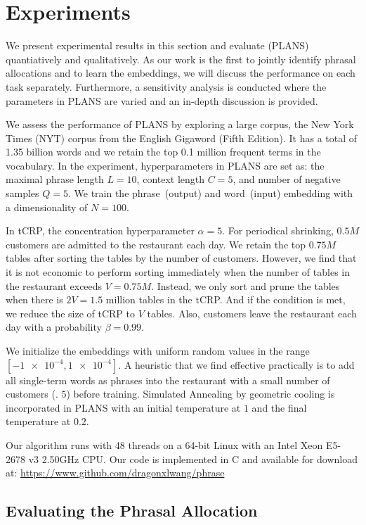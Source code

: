 \section{Experiments}

We present  experimental results in this section and evaluate
\PLANS{} (PLANS)  quantiatively and qualitatively. As our work is the
first to jointly identify phrasal allocations and to learn the embeddings, we
will discuss the performance on each task separately. Furthermore, a
sensitivity analysis is conducted where the parameters in PLANS are varied and
an in-depth discussion is provided.

We assess the performance of PLANS by exploring a large corpus, the New York
Times (NYT) corpus from the English Gigaword (Fifth Edition). It has a total of
1.35 billion words and we retain the top 0.1 million frequent terms in the
vocabulary. In the experiment, hyperparameters in PLANS are set as: the maximal
phrase length $L = 10$, context length $C = 5$, and number of negative samples
$Q = 5$. We train the phrase~(output) and word~(input) embedding with a
dimensionality of $N = 100$.

In tCRP, the concentration hyperparameter $\alpha = 5$. For periodical shrinking,
$0.5M$ customers are admitted to the restaurant each day. We retain the top
$0.75M$ tables after sorting the tables by the number of customers. However, we
find that it is not economic to perform sorting immediately when the number of
tables in the restaurant exceeds $V = 0.75M$.  Instead, we only sort and prune
the tables when there is $2V = 1.5$ million tables in the tCRP. And if the
condition is met, we reduce the size of tCRP to $V$ tables. Also, customers
leave the restaurant each day with a probability $\beta = 0.99$.

We initialize the embeddings with uniform random values in the range
$[\SI{-1e-4}, \SI{1e-4}]$. A heuristic that we find effective practically is to
add all single-term words as phrases into the restaurant with a small number of
customers (\eg. $5$) before training. Simulated Annealing by geometric cooling
is incorporated in PLANS with an initial temperature at $1$ and the final
temperature at $0.2$.

Our algorithm runs with 48 threads on a 64-bit Linux with an Intel Xeon E5-2678
v3 2.50GHz CPU. Our code is implemented in C and available for download at:
\url{https://www.github.com/dragonxlwang/phrase}

\subsection{Evaluating the Phrasal Allocation}


